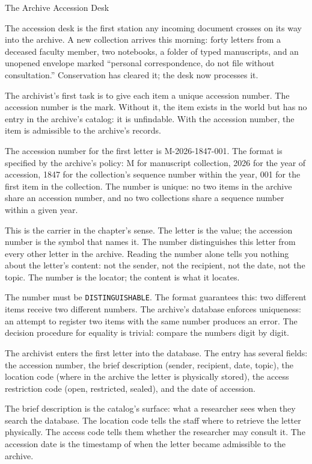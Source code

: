 \begin{coda}{The Archive Accession Desk}

The accession desk is the first station any incoming document
crosses on its way into the archive. A new collection arrives this
morning: forty letters from a deceased faculty member, two notebooks,
a folder of typed manuscripts, and an unopened envelope marked
``personal correspondence, do not file without consultation.''
Conservation has cleared it; the desk now processes it.

The archivist's first task is to give each item a unique accession number.
The accession number is the mark. Without it, the item exists in the world
but has no entry in the archive's catalog: it is unfindable. With the
accession number, the item is admissible to the archive's records.

The accession number for the first letter is M-2026-1847-001. The format is
specified by the archive's policy: M for manuscript collection, 2026 for the
year of accession, 1847 for the collection's sequence number within the year,
001 for the first item in the collection. The number is unique: no two items
in the archive share an accession number, and no two collections share a
sequence number within a given year.

This is the carrier in the chapter's sense. The letter is the value; the
accession number is the symbol that names it. The number distinguishes this
letter from every other letter in the archive. Reading the number alone
tells you nothing about the letter's content: not the sender, not the
recipient, not the date, not the topic. The number is the locator; the
content is what it locates.

The number must be \texttt{DISTINGUISHABLE}. The format guarantees this: two
different items receive two different numbers. The archive's database
enforces uniqueness: an attempt to register two items with the same number
produces an error. The decision procedure for equality is trivial: compare
the numbers digit by digit.

The archivist enters the first letter into the database. The entry has
several fields: the accession number, the brief description (sender,
recipient, date, topic), the location code (where in the archive the letter
is physically stored), the access restriction code (open, restricted,
sealed), and the date of accession.

The brief description is the catalog's surface: what a researcher sees when
they search the database. The location code tells the staff where to
retrieve the letter physically. The access code tells them whether the
researcher may consult it. The accession date is the timestamp of when the
letter became admissible to the archive.


\end{coda}
